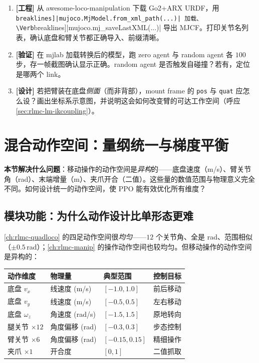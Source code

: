\begin{practice}[练习·复合建模]
\begin{enumerate}
\item \textbf{[工程]} 从 awesome-loco-manipulation 下载 Go2+ARX URDF，用 \Verb[breaklines]|mujoco.MjModel.from_xml_path(...)| 加载、\Verb[breaklines]|mujoco.mj_saveLastXML(...)| 导出 MJCF。打印关节名列表，确认底盘和臂关节都正确导入、前缀清晰。
\item \textbf{[验证]} 在 mjlab 加载转换后的模型，跑 zero agent 与 random agent 各 $100$ 步，存一帧截图确认显示正确。random agent 是否触发自碰撞？若有，定位是哪两个 link。
\item \textbf{[设计]} 若把臂装在底盘\emph{侧面}（而非背部），mount frame 的 \verb|pos| 与 \verb|quat| 应怎么设？画出坐标系示意图，并说明这会如何改变臂的可达工作空间（呼应 \cref{sec:rlmc-lm-ikcoupling}）。
\end{enumerate}
\end{practice}

\section{混合动作空间：量纲统一与梯度平衡}
\label{sec:rlmc-lm-action}

\textbf{本节解决什么问题}：移动操作的动作空间是\emph{异构}的——底盘速度（m/s）、臂关节角（rad）、末端增量（m）、夹爪开合（二值）。这些量的数值范围与物理意义完全不同。如何设计统一的动作空间，使 PPO 能有效优化所有维度？

\subsection{模块功能：为什么动作设计比单形态更难}
\label{sec:rlmc-lm-action-why}

\cref{ch:rlmc-quadloco} 的四足动作空间很\emph{均匀}——$12$ 个关节角、全是 rad、范围相似（$\pm0.5\,$rad）；\cref{ch:rlmc-manip} 的操作动作空间也较均匀。但移动操作的动作空间是异构的：

\begin{center}
\small
\begin{tabular}{@{}llll@{}}
\toprule
动作维度 & 物理量 & 典型范围 & 控制目标 \\
\midrule
底盘 $v_x$ & 线速度 (m/s) & $[-1.0, 1.0]$ & 前后移动 \\
底盘 $v_y$ & 线速度 (m/s) & $[-0.5, 0.5]$ & 左右移动 \\
底盘 $\omega_z$ & 角速度 (rad/s) & $[-1.5, 1.5]$ & 原地转向 \\
腿关节 $\times 12$ & 角度偏移 (rad) & $[-0.3, 0.3]$ & 步态控制 \\
臂关节 $\times 6$ & 角度偏移 (rad) & $[-0.15, 0.15]$ & 精细操作 \\
夹爪 $\times 1$ & 开合度 & $[0, 1]$ & 二值抓取 \\
\bottomrule
\end{tabular}
\end{center}

